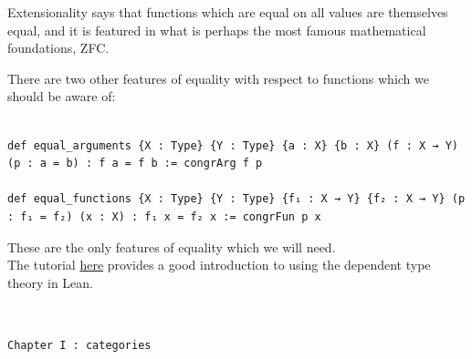 \documentclass{book}
\newcounter{lcounter}
\begin{document}
Extensionality says that functions which are equal on all values are themselves equal, and it is featured in what is perhaps the most famous mathematical foundations, ZFC.

There are two other features of equality with respect to functions which we should be aware of:

\begin{center}
\begin{tcolorbox}[width=5in,colback={white},title={\begin{center}\texttt{Lean \thelcounter} \addtocounter{lcounter}{1}  \end{center}},colbacktitle=Blue,coltitle=black]
\begin{verbatim}

def equal_arguments {X : Type} {Y : Type} {a : X} {b : X} (f : X → Y) (p : a = b) : f a = f b := congrArg f p

def equal_functions {X : Type} {Y : Type} {f₁ : X → Y} {f₂ : X → Y} (p : f₁ = f₂) (x : X) : f₁ x = f₂ x := congrFun p x

\end{verbatim}%
\end{tcolorbox}
\end{center}
These are the only features of equality which we will need.\\

The tutorial \href{https://leanprover.github.io/theorem_proving_in_lean4/}{here} provides a good introduction to using the dependent type theory in Lean.

\newpage
\ \\
{
\Huge 
\begin{center}
\texttt{Chapter I : categories}
\end{center}
\thispagestyle{empty}
}

\ \\
\ \\
\ \\
\ \\
\end{document}
